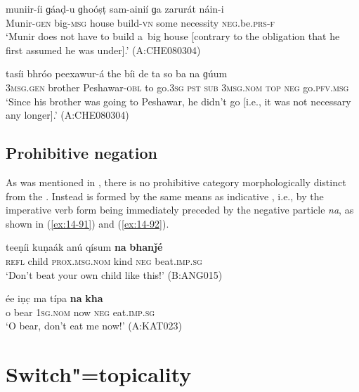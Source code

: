 \begin{exe}
\ex
\label{ex:14-89}
\gll muniir-íi ɡáaḍ-u ɡhoóṣṭ sam-ainií ɡa zarurát  náin-i \\
Munir-\textsc{gen} big-\textsc{msg} house build-\textsc{vn} some necessity  \textsc{neg.}be.\textsc{prs}-\textsc{f } \\
\glt `Munir does not have to build a~big house [contrary to the obligation that he first assumed he was under].' (A:CHE080304)

\ex
\label{ex:14-90}
\gll tasíi bhróo peexawur-á the bíi de ta so ba na ɡúum \\
\textsc{3msg}.\textsc{gen} brother Peshawar-\textsc{obl} to go.\textsc{3sg} \textsc{pst} \textsc{sub}  \textsc{3msg.nom} \textsc{top} \textsc{neg} go.\textsc{pfv.msg } \\
\glt `Since his brother was going to Peshawar, he didn't go [i.e., it was not necessary any longer].' (A:CHE080304)
\end{exe}

\subsection{Prohibitive negation}
\label{subsec:14-3-5}


As was mentioned in , there is no prohibitive category morphologically distinct from the . Instead  is formed by the same means as indicative , i.e., by the imperative verb form being immediately preceded by the negative particle \textit{na}, as shown in (\ref{ex:14-91}) and (\ref{ex:14-92}).

\begin{exe}
\ex
\label{ex:14-91}
\gll teeṇíi kuṇaák anú qísum \textbf{na} \textbf{bhanǰé} \\
\textsc{refl} child \textsc{prox.msg.nom} kind \textsc{neg} beat.\textsc{imp.sg}  \\
\glt `Don't beat your own child like this!' (B:ANG015)

\ex
\label{ex:14-92}
\gll ée iṇc̣ ma típa \textbf{na} \textbf{kha} \\
o bear \textsc{1sg.nom} now \textsc{neg} eat.\textsc{imp.sg } \\
\glt `O bear, don't eat me now!' (A:KAT023)
\end{exe}

\section{Switch"=topicality}
\label{sec:14-4}


